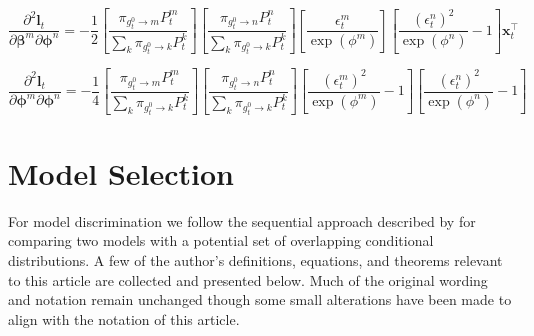 \documentclass[12pt]{article}
\newcommand{\gateprod}[2]{\pi_{#1 \longrightarrow #2}}
\theoremstyle{definition}
\begin{document}
\begin{equation} 
  \frac{\partial^{2} \boldsymbol{l}_{t}}{\partial \boldsymbol{\beta}^{m} \partial \boldsymbol{\phi}^{n} } = - \frac{1}{2}  \left[ \frac{\gateprod{g^{0}_{t}}{m} P^{m}_{t}}{ \sum_{k} \gateprod{g^{0}_{t}}{k} P^{k}_{t}} \right] \left[ \frac{\gateprod{g^{0}_{t}}{n} P^{n}_{t}}{ \sum_{k} \gateprod{g^{0}_{t}}{k} P^{k}_{t}} \right]  \left[ \frac{\epsilon^{m}_{t}}{\exp(\phi^{m})} \right] \left[  \frac{ (\epsilon^{n}_{t})^{2} }{\exp(\phi^{n})} - 1 \right] \boldsymbol{x}_{t}^{\top} 
\end{equation}

\begin{equation} 
  \frac{\partial^{2} \boldsymbol{l}_{t}}{\partial \boldsymbol{\phi}^{m} \partial \boldsymbol{\phi}^{n} } =  -\frac{1}{4} \left[ \frac{\gateprod{g^{0}_{t}}{m} P^{m}_{t}}{ \sum_{k} \gateprod{g^{0}_{t}}{k} P^{k}_{t}} \right] \left[ \frac{\gateprod{g^{0}_{t}}{n} P^{n}_{t}}{ \sum_{k} \gateprod{g^{0}_{t}}{k} P^{k}_{t}} \right]  \left[ \frac{ (\epsilon^{m}_{t})^{2} }{\exp(\phi^{m})} - 1 \right] \left[ \frac{ (\epsilon^{n}_{t})^{2} }{\exp(\phi^{n})} - 1 \right] 
\end{equation}


\section{Model Selection} \label{sec:ModelSelection}

For model discrimination we follow the sequential approach described 
by \citet{Voung1989} for comparing two models with a potential set of overlapping
conditional distributions. A few of the author's definitions, equations, and theorems relevant 
to this article are collected and presented below. Much of the original wording
and notation remain unchanged though some small alterations have been made to align with the
notation of this article. 

\bigskip
\end{document}
